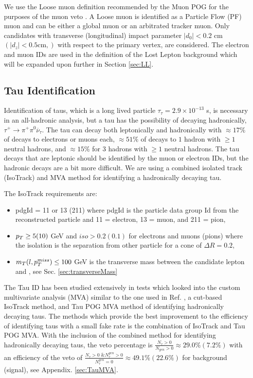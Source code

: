  We use the Loose muon definition recommended by the Muon POG for the purposes of the muon veto \cite{noauthor_https://twiki.cern.ch/twiki/bin/view/cmspublic/swguidemuonidloose_muon_nodate}. A Loose muon is identified as a Particle Flow (PF)\cite{noauthor_cms_nodate} muon and can be either a global muon or an arbitrated tracker muon. Only candidates with transverse (longitudinal) impact parameter $|d_0|<0.2$ cm $(|d_z|<0.5 \text{cm},)$ with respect to the primary vertex, are considered. The electron and muon IDs are used in the definition of the Lost Lepton background which will be expanded upon further in Section \ref{sec:LL}. 
 
\subsection{Tau Identification}\label{TauID}
Identification of taus, which is a long lived particle $\tau_\tau=2.9\times10^{-13}$ s, is necessary in an all-hadronic analysis, but a tau has the possibility of decaying hadronically, $\tau^+\rightarrow \pi^+\pi^0\overline{\nu}_\tau$. The tau can decay both leptonically and hadronically with $\approx17\%$ of decays to electrons or muons each, $\approx51\%$ of decays to $1$ hadron with $\geq1$ neutral hadrons, and $\approx15\%$ for 3 hadrons with $\geq1$ neutral hadrons. The tau decays that are leptonic should be identified by the muon or electron IDs, but the hadronic decays are a bit more difficult. We are using a combined isolated track (IsoTrack) and MVA method for identifying a hadronically decaying tau. 

The IsoTrack requirements are:
\begin{itemize}
	\item pdgId = 11 or 13 (211) where pdgId is the particle data group Id from the reconstructed particle and 11 = electron, 13 = muon, and 211 = pion,
	\item $p_{T}\geq5(10)$ GeV and $iso>0.2(0.1)$ for electrons and muons (pions) where the isolation is the separation from other particle for a cone of $\Delta R=0.2$,
	\item $m_T(l,p_{T}^{miss})\leq100$ GeV is the transverse mass between the candidate lepton and \met, see Sec. \ref{sec:transverseMass}
\end{itemize}

The Tau ID has been studied extensively in tests which looked into the custom multivariate analysis (MVA) \cite{roe_boosted_2004, hoecker_tmva_2007, bravo_search_2015} similar to the one used in Ref. \cite{cms_collaboration_search_2016}, a cut-based IsoTrack method, and Tau POG MVA method of identifying hadronically decaying taus. The methods which provide the best improvement to the efficiency of identifying taus with a small fake rate is the combination of IsoTrack and Tau POG MVA. With the inclusion of the combined method for identifying hadronically decaying taus, the veto percentage is $\frac{N_\tau>0}{N_{gen}>0}\approx29.0\%(7.2\%)$ with an efficiency of the veto of $\frac{N_\tau>0\text{ \& }N_\tau^{gen}>0}{N_\tau^{gen}=0}\approx49.1\%(22.6\%)$ for \ttbar{} background (signal), see Appendix. \ref{sec:TauMVA}. 

